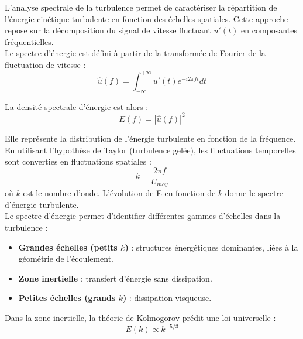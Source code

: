 \documentclass[12pt, a4paper]{report}
\begin{document}
	L'analyse spectrale de la turbulence permet de caractériser la répartition de l'énergie cinétique turbulente en fonction des échelles spatiales. Cette approche repose sur la décomposition du signal de vitesse fluctuant $u'(t)$ en composantes fréquentielles.\\
		
	 \noindent Le spectre d'énergie est défini à partir de la transformée de Fourier de la fluctuation de vitesse :
	\begin{equation*}
		\hat{u}(f) = \int_{-\infty}^{+\infty} u'(t) e^{-i 2\pi f t} dt
	\end{equation*}
	
	\noindent La densité spectrale d'énergie est alors :
	\begin{equation*}
		E(f) = |\hat{u}(f)|^2
	\end{equation*}
	
	\noindent Elle représente la distribution de l'énergie turbulente en fonction de la fréquence.\\
		
	\noindent En utilisant l'hypothèse de Taylor (turbulence gelée), les fluctuations temporelles sont converties en fluctuations spatiales :
	\begin{equation}
		k = \frac{2\pi f}{U_{moy}}
	\end{equation}
	\noindent où $k$ est le nombre d'onde. L'évolution de E en fonction de $k$ donne le spectre d'énergie turbulente.\\
	
	\noindent Le spectre d'énergie permet d'identifier différentes gammes d'échelles dans la turbulence :\\
	
	\begin{itemize}
		\item \textbf{Grandes échelles (petits $k$)} : structures énergétiques dominantes, liées à la géométrie de l'écoulement.
		\item \textbf{Zone inertielle} : transfert d'énergie sans dissipation.
		\item \textbf{Petites échelles (grands $k$)} : dissipation visqueuse.
	\end{itemize}\vspace{3mm}
	
	\noindent Dans la zone inertielle, la théorie de Kolmogorov prédit une loi universelle :
	\begin{equation}
		E(k) \propto k^{-5/3}
	\end{equation}
	
\end{document}
